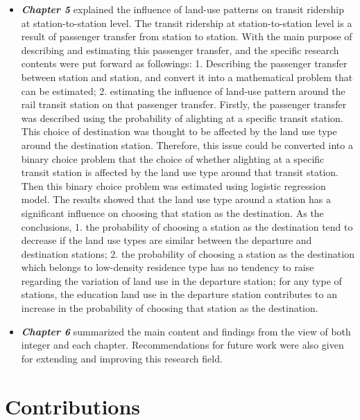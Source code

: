 \begin{itemize}
	\item \emph{\textbf{Chapter 5}} explained the influence of land-use patterns on transit ridership at station-to-station level. The transit ridership at station-to-station level is a result of passenger transfer from station to station. With the main purpose of describing and estimating this passenger transfer, and the specific research contents were put forward as followings: 1. Describing the passenger transfer between station and station, and convert it into a mathematical problem that can be estimated; 2. estimating the influence of land-use pattern around the rail transit station on that passenger transfer. Firstly, the passenger transfer was described using the probability of alighting at a specific transit station. This choice of destination was thought to be affected by the land use type around the destination station. Therefore, this issue could be converted into a binary choice problem that the choice of whether alighting at a specific transit station is affected by the land use type around that transit station. Then this binary choice problem was estimated using logistic regression model. The results showed that the land use type around a station has a significant influence on choosing that station as the destination. As the conclusions, 1. the probability of choosing a station as the destination tend to decrease if the land use types are similar between the departure and destination stations; 2. the probability of choosing a station as the destination which belongs to low-density residence type has no tendency to raise regarding the variation of land use in the departure station; for any type of stations, the education land use in the departure station contributes to an increase in the probability of choosing that station as the destination.
	
	\item \emph{\textbf{Chapter 6}} summarized the main content and findings from the view of both integer and each chapter. Recommendations for future work were also given for extending and improving this research field.
\end{itemize}

\section{Contributions}

